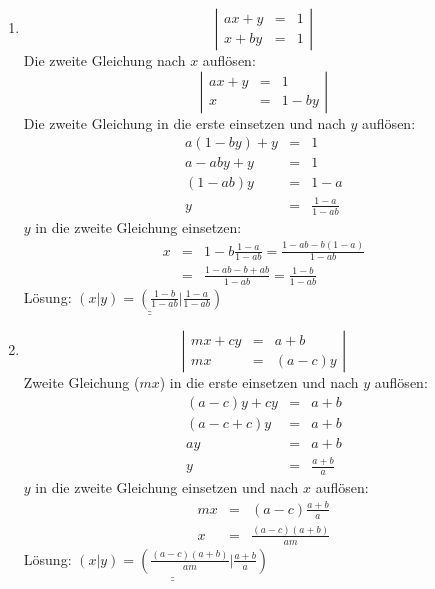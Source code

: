 \documentclass[%
11pt,%
twoside,%
titlepage,%
german,%
]{scrartcl}
\newcommand{\result}[1]{\underline{\underline{#1}}}
\begin{document}
\begin{enumerate}
\begin{enumerate}
  \item 
    \begin{displaymath}
      \left| 
        \begin{array}{rcl}
         ax+y & = & 1 \\
         x+by & = & 1
        \end{array} \right|
    \end{displaymath}
    Die zweite Gleichung nach $x$ aufl\"osen:
    \begin{displaymath}
      \left| 
        \begin{array}{rcl}
         ax+y & = & 1 \\
         x & = & 1-by
        \end{array} \right|
    \end{displaymath}
    Die zweite Gleichung in die erste einsetzen und nach $y$ aufl\"osen:
    \begin{eqnarray*}
      a(1-by)+y & = & 1 \\
      a-aby+y & = & 1 \\
      (1-ab)y & = & 1-a \\
      y & = & \frac{1-a}{1-ab}
    \end{eqnarray*}
    $y$ in die zweite Gleichung einsetzen:
    \begin{eqnarray*}
      x & = & 1-b\frac{1-a}{1-ab} = \frac{1-ab-b(1-a)}{1-ab} \\
      & = & \frac{1-ab-b+ab}{1-ab} = \frac{1-b}{1-ab}
    \end{eqnarray*}
    L\"osung: $\result{(x|y)=(\frac{1-b}{1-ab}|\frac{1-a}{1-ab})}$

  \item 
    \begin{displaymath}
      \left| 
        \begin{array}{rcl}
         mx+cy & = & a+b \\
         mx & = & (a-c)y
        \end{array} \right|
    \end{displaymath}
    Zweite Gleichung ($mx$) in die erste einsetzen und nach $y$ aufl\"osen:
    \begin{eqnarray*}
      (a-c)y +cy & = & a+b \\
      (a-c+c)y & = & a+b \\
      ay & = & a+b \\
      y & = & \frac{a+b}{a}
    \end{eqnarray*}
    $y$ in die zweite Gleichung einsetzen und nach $x$ aufl\"osen:
    \begin{eqnarray*}
      mx & = & (a-c)\frac{a+b}{a} \\
      x & = & \frac{(a-c)(a+b)}{am}
    \end{eqnarray*}
    L\"osung: $\result{(x|y)=(\frac{(a-c)(a+b)}{am}|\frac{a+b}{a})}$


\end{enumerate}
\end{enumerate}
\end{document}
